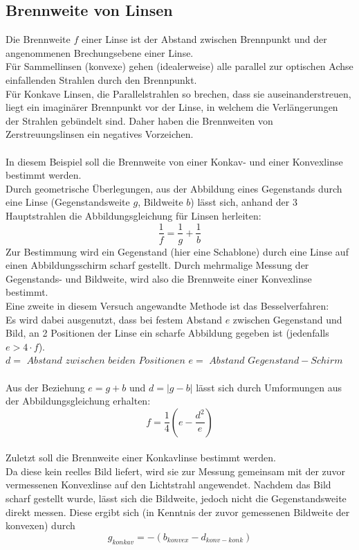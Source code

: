 \documentclass[12pt,a4paper]{article}
\begin{document}
\pagebreak
\setlength{\columnsep}{20pt}
\begin{multicols}{2}

\section{Brennweite von Linsen}
Die Brennweite $f $ einer Linse ist der Abstand zwischen Brennpunkt und der angenommenen Brechungsebene einer Linse. \\
Für Sammellinsen (konvexe) gehen (idealerweise) alle parallel zur optischen Achse einfallenden Strahlen durch den Brennpunkt.\\
Für Konkave Linsen, die Parallelstrahlen so brechen, dass sie auseinanderstreuen, liegt ein imaginärer Brennpunkt vor der Linse, in welchem die Verlängerungen der Strahlen gebündelt sind. Daher haben die Brennweiten von Zerstreuungslinsen ein negatives Vorzeichen.\\
\\
In diesem Beispiel soll die Brennweite von einer Konkav- und einer Konvexlinse bestimmt werden.\\
Durch geometrische Überlegungen, aus der Abbildung eines Gegenstands durch eine Linse (Gegenstandsweite $g$, Bildweite $b$) lässt sich, anhand der 3 Hauptstrahlen die Abbildungsgleichung für Linsen herleiten:
$$\frac{1}{f}=\frac{1}{g}+ \frac{1}{b}$$
Zur Bestimmung wird ein Gegenstand (hier eine Schablone) durch eine Linse auf einen Abbildungsschirm scharf gestellt. Durch mehrmalige Messung der Gegenstands- und Bildweite, wird also die Brennweite einer Konvexlinse bestimmt.\\
Eine zweite in diesem Versuch angewandte Methode ist das Besselverfahren:\\
Es wird dabei ausgenutzt, dass bei festem Abstand $e$ zwischen Gegenstand und Bild, an 2 Positionen der Linse ein scharfe Abbildung gegeben ist (jedenfalls $e > 4\cdot f$).\\
$d =$ $Abstand$ $zwischen$ $beiden$ $Positionen$
$e=$ $Abstand$ $Gegenstand-Schirm$\\
\\
Aus der Beziehung $e = g + b$ und $d=|g-b|$ lässt sich durch Umformungen aus der Abbildungsgleichung erhalten:
$$f=\frac{1}{4} \left(e-\frac{d^2}{e} \right)$$
\\
Zuletzt soll die Brennweite einer Konkavlinse bestimmt werden.\\
Da diese kein reelles Bild liefert, wird sie zur Messung gemeinsam mit der zuvor vermessenen Konvexlinse auf den Lichtstrahl angewendet. Nachdem das Bild scharf gestellt wurde, lässt sich die Bildweite, jedoch nicht die Gegenstandsweite direkt messen. Diese ergibt sich (in Kenntnis der zuvor gemessenen Bildweite der konvexen) durch
$$g_{konkav}= -(b_{konvex}-d_{konv-konk})$$



\end{multicols}
\end{document}
